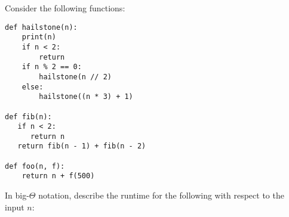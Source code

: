 \begin{blocksection}
\question Consider the following functions:
\begin{lstlisting}
def hailstone(n):
    print(n)
    if n < 2:
        return
    if n % 2 == 0:
        hailstone(n // 2)
    else:
        hailstone((n * 3) + 1)

def fib(n):
   if n < 2:
      return n
   return fib(n - 1) + fib(n - 2)

def foo(n, f):
    return n + f(500)
\end{lstlisting}
In big-$\Theta$ notation, describe the runtime for the following with respect to the input $n$:

\end{blocksection}
